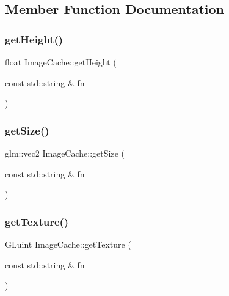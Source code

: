 \subsection{Member Function Documentation}
\mbox{\label{classsage_1_1ImageCache_ab3fbe32a2cc379e05fb53a9883e20401}} 
\subsubsection{\texorpdfstring{getHeight()}{getHeight()}}
{\footnotesize\ttfamily float Image\+Cache\+::get\+Height (\begin{DoxyParamCaption}\item[{const std\+::string \&}]{fn }\end{DoxyParamCaption})}

\mbox{\label{classsage_1_1ImageCache_ac81e10d00d95b6d5acdffad8b54bff09}} 
\subsubsection{\texorpdfstring{getSize()}{getSize()}}
{\footnotesize\ttfamily glm\+::vec2 Image\+Cache\+::get\+Size (\begin{DoxyParamCaption}\item[{const std\+::string \&}]{fn }\end{DoxyParamCaption})}

\mbox{\label{classsage_1_1ImageCache_a36611ddea849d743f31ad68972946002}} 
\subsubsection{\texorpdfstring{getTexture()}{getTexture()}}
{\footnotesize\ttfamily G\+Luint Image\+Cache\+::get\+Texture (\begin{DoxyParamCaption}\item[{const std\+::string \&}]{fn }\end{DoxyParamCaption})}

